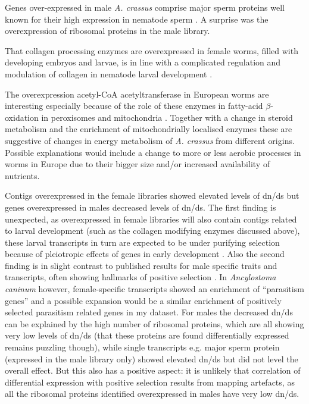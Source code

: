 Genes over-expressed in male \textit{A. crassus} comprise major sperm
proteins well known for their high expression in nematode sperm
\cite{pmid15275275}. A surprise was the overexpression of ribosomal
proteins in the male library.

That collagen processing enzymes are overexpressed in female worms,
filled with developing embryos and larvae, is in line with a
complicated regulation and modulation of collagen in nematode larval
development \cite{pmid10637627}.

The overexpression acetyl-CoA acetyltransferase in European worms are
interesting especially because of the role of these enzymes in
fatty-acid $\beta$-oxidation in peroxisomes and mitochondria
\cite{pmid4721607}. Together with a change in steroid metabolism and
the enrichment of mitochondrially localised enzymes these are
suggestive of changes in energy metabolism of \textit{A. crassus} from
different origins. Possible explanations would include a change to
more or less aerobic processes in worms in Europe due to their bigger
size and/or increased availability of nutrients.

Contigs overexpressed in the female libraries showed elevated levels
of dn/ds but genes overexpressed in males decreased levels of
dn/ds. The first finding is unexpected, as overexpressed in female
libraries will also contain contigs related to larval development
(such as the collagen modifying enzymes discussed above), these larval
transcripts in turn are expected to be under purifying selection
because of pleiotropic effects of genes in early development
\cite{pmid15371532}. Also the second finding is in slight contrast to
published results for male specific traits and transcripts, often
showing hallmarks of positive selection
\cite{pmid15795858,pmid11404480}. In \textit{Ancylostoma caninum}
however, female-specific transcripts showed an enrichment of
``parasitism genes'' \cite{pmid20470405} and a possible expansion
would be a similar enrichment of positively selected parasitism
related genes in my dataset. For males the decreased dn/ds can be
explained by the high number of ribosomal proteins, which are all
showing very low levels of dn/ds (that these proteins are found
differentially expressed remains puzzling though), while single
transcripts e.g. major sperm protein (expressed in the male library
only) showed elevated dn/ds but did not level the overall effect. But
this also has a positive aspect: it is unlikely that correlation of
differential expression with positive selection results from mapping
artefacts, as all the ribosomal proteins identified overexpressed in
males have very low dn/ds.

